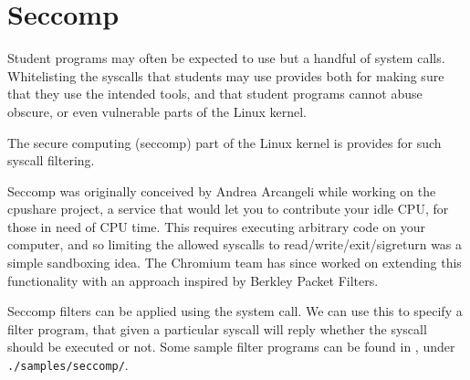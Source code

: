 
\section{Seccomp}

Student programs may often be expected to use but a handful of system calls.
Whitelisting the syscalls that students may use provides both for making sure
that they use the intended tools, and that student programs cannot abuse
obscure, or even vulnerable parts of the Linux kernel.

The secure computing (seccomp) part of the Linux kernel is provides for such
syscall filtering\cite{seccomp-filter.txt}.

Seccomp was originally conceived by Andrea Arcangeli\cite{arcangeli-2005} while
working on the cpushare project, a service that would let you to contribute
your idle CPU, for those in need of CPU time\cite{lwn.net-2005}. This requires
executing arbitrary code on your computer, and so limiting the allowed syscalls
to read/write/exit/sigreturn was a simple sandboxing idea. The Chromium team
has since worked on extending this functionality\cite{tinnes-2012} with an
approach inspired by Berkley Packet Filters\cite{drewry-2012}.

Seccomp filters can be applied using the \cite{man-2-prctl} system call. We can
use this to specify a filter program, that given a particular syscall will
reply whether the syscall should be executed or not. Some sample filter
programs can be found in \cite{linux-kernel-v3.14.2}, under
\texttt{./samples/seccomp/}.
